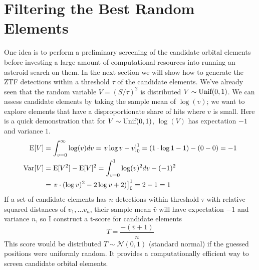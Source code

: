 \section{Filtering the Best Random Elements}
\label{section_best_random_elements}
One idea is to perform a preliminary screening of the candidate orbital elements 
before investing a large amount of computational resources into running an asteroid search on them.
In the next section we will show how to generate the ZTF detections within a threshold $\tau$ of the candidate elements.
We've already seen that the random variable $V = (S/ \tau)^2$ is distributed $V \sim \textnormal{Unif}(0, 1)$.
We can assess candidate elements by taking the sample mean of $\log(v)$;
we want to explore elements that have a disproportionate share of hits where $v$ is small.
Here is a quick demonstration that for $V \sim \textnormal{Unif}(0,1)$, $\log(V)$ has expectation $-1$ and variance $1$.
\begin{align*}
\mathrm{E}[ V ] &= \int_{v=0}^{\infty} \log (v) dv = \left. v \log v - v \right]_{0}^{1} = (1 \cdot \log 1 - 1) - (0 - 0) = -1 \\
\mathrm{Var}[V ] &= \mathrm{E}[V^2] - \mathrm{E}[V]^2 = \int_{v=0}^{1} \log(v)^2 dv - (-1)^2 \\
&= \left. v \cdot (\log v)^2 - 2 \log v + 2) \right]_{0}^{1} = 2 -1 = 1
\end{align*}
If a set of candidate elements has $n$ detections within threshold $\tau$ with relative squared distances of $v_1, \ldots v_n$,
their sample mean $\bar{v}$ will have expectation $-1$ and variance $n$, so I construct a t-score for candidate elements
$$T = \frac{-(\bar{v} + 1)}{n}$$
This score would be distributed $T \sim \mathcal{N}(0, 1)$ (standard normal) if the guessed positions were uniformly random.
It provides a computationally efficient way to screen candidate orbital elements.

